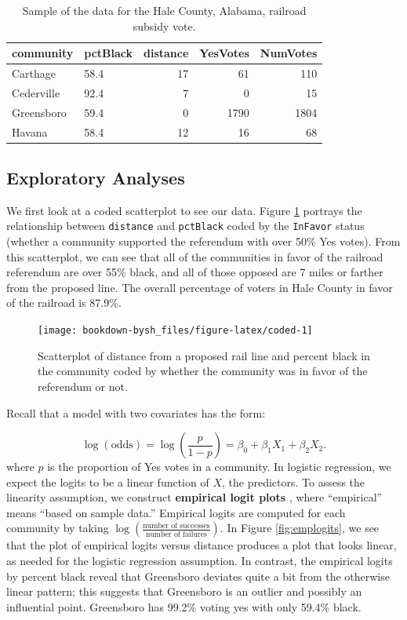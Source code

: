 \documentclass[
]{krantz}
\begin{document}
\begin{table}

\caption{\label{tab:table2chp6}Sample of the data for the Hale County, Alabama, railroad subsidy vote.}
\centering
\begin{tabular}[t]{llrrr}
\toprule
community & pctBlack & distance & YesVotes & NumVotes\\
\midrule
Carthage & 58.4 & 17 & 61 & 110\\
Cederville & 92.4 & 7 & 0 & 15\\
Greensboro & 59.4 & 0 & 1790 & 1804\\
Havana & 58.4 & 12 & 16 & 68\\
\bottomrule
\end{tabular}
\end{table}

\hypertarget{exploratory-analyses}{%
\subsection{Exploratory Analyses}\label{exploratory-analyses}}

We first look at a coded scatterplot to see our data. Figure \ref{fig:coded} portrays the relationship between \texttt{distance} and \texttt{pctBlack} coded by the \texttt{InFavor} status (whether a community supported the referendum with over 50\% Yes votes). From this scatterplot, we can see that all of the communities in favor of the railroad referendum are over 55\% black, and all of those opposed are 7 miles or farther from the proposed line. The overall percentage of voters in Hale County in favor of the railroad is 87.9\%.

\begin{figure}

{\centering \texttt{[image: bookdown-bysh\_files/figure-latex/coded-1]} 

}

\caption{ Scatterplot of distance from a proposed rail line and percent black in the community coded by whether the community was in favor of the referendum or not.}\label{fig:coded}
\end{figure}

Recall that a model with two covariates has the form:

\[\log(\textrm{odds}) = \log\left(\frac{p}{1-p}\right) = \beta_0+\beta_1X_1+\beta_2X_2.\]
where \(p\) is the proportion of Yes votes in a community. In logistic regression, we expect the logits to be a linear function of \(X\), the predictors. To assess the linearity assumption, we construct \textbf{empirical logit plots} , where ``empirical'' means ``based on sample data.'' Empirical logits are computed for each community by taking \(\log\left(\frac{\textrm{number of successes}}{\textrm{number of failures}}\right)\). In Figure \ref{fig:emplogits}, we see that the plot of empirical logits versus distance produces a plot that looks linear, as needed for the logistic regression assumption. In contrast, the empirical logits by percent black reveal that Greensboro deviates quite a bit from the otherwise linear pattern; this suggests that Greensboro is an outlier and possibly an influential point. Greensboro has 99.2\% voting yes with only 59.4\% black.
\end{document}

